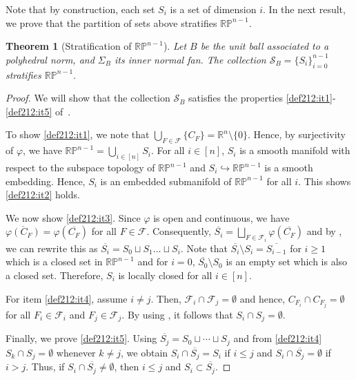 \documentclass{article}
\newtheorem{theorem}{Theorem}
\numberwithin{theorem}{section}
\theoremstyle{definition}
\theoremstyle{example_contd}
\newcommand{\F}{\mathcal{F}}
\newcommand{\RR}{\mathbb{R}}
\newcommand{\PP}{{\mathbb{P}}}
\newcommand{\Rp}{{\mathbb{RP}}}
\begin{document}
Note that by construction, each set $S_i$ is a set of dimension $i.$ In the next result, we prove that the partition of sets above stratifies $\RR\PP^{n-1}.$


\begin{theorem}[Stratification of $\RR\PP^{n-1}$]\label{thm:strat-sphere}
	Let $B$ be the unit ball associated to a polyhedral norm, and $\Sigma_B$ its inner normal fan. The collection $\mathcal{S}_B=\{S_i\}_{i=0}^{n-1}$ stratifies $\RR\PP^{n-1}.$
\end{theorem}	

\begin{proof}
	We will show that the collection $\mathcal{S}_B$ satisfies the properties \ref{def212:it1}-\ref{def212:it5} of~.
	
	To show \ref{def212:it1}, we note that $\bigcup_{F\in \F}\{C_F\}=\RR^{n}\setminus\{0\}$. Hence, by surjectivity of $\varphi$, we have $\Rp^{n-1}=\bigcup_{i\in [n]}S_i.$
For all $i\in [n]$, $S_i$ is a smooth manifold with respect to the subspace topology of $\Rp^{n-1}$ and $S_i\hookrightarrow \Rp^{n-1}$ is a smooth embedding. Hence, $S_i$ is an embedded submanifold of $\Rp^{n-1}$ for all $i$. This shows \ref{def212:it2} holds.
	
	We now show \ref{def212:it3}. Since $\varphi$ is open and continuous, we have $\overline{\varphi(C_F)}=\varphi(\overline{C_F})$ for all $F\in \F$. Consequently, $\overline{S_i}=\bigsqcup_{F\in \F_i} \varphi(\overline{C_F})$ and by , we can rewrite this as $\overline{S_i}=S_0\sqcup S_1 \ldots \sqcup S_{i}$. Note that $\overline{S_i}\setminus S_i=\overline{S_{i-1}}$ for $i\geq 1$ which is a closed set in $\Rp^{n-1}$ and for $i=0$, $\overline{S_0}\setminus S_0$ is an empty set which is also a closed set. Therefore, $S_i$ is locally closed for all $i\in [n]$.
	
	For item \ref{def212:it4}, assume $i\neq j$. Then, $\F_i \cap \F_j=\emptyset$ and hence, $C_{F_i}\cap C_{F_j}=\emptyset$ for all $F_i\in \F_i$ and $F_j\in \F_j.$ By using , it follows that $S_i\cap S_j=\emptyset$.
	
	Finally, we prove \ref{def212:it5}. Using $\overline{S_j}=S_0\sqcup\cdots \sqcup S_j$ and from  \ref{def212:it4} $S_k\cap S_j=\emptyset$ whenever $k\neq j$, we obtain $S_i\cap \overline{S_j}=S_i$ if $i\leq j$ and $S_i\cap \overline{S_j}=\emptyset$
	if $i>j$. Thus, if $S_i\cap \overline{S_j}\neq \emptyset$, then $i\leq j$ and $S_i\subset \overline{S_j}$.
\end{proof}
\end{document}
